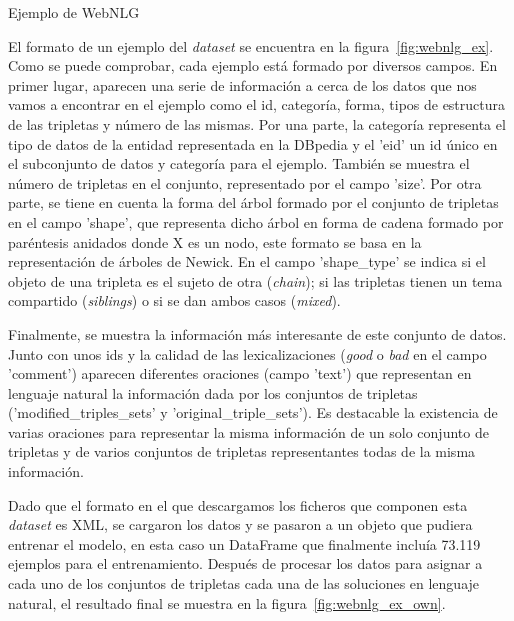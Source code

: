 %
{Ejemplo de WebNLG}

El formato de un ejemplo del \textit{dataset} se encuentra en la figura~\ref{fig:webnlg_ex}. Como se puede comprobar, cada ejemplo está formado por diversos campos. En primer lugar, aparecen una serie de información a cerca de los datos que nos vamos a encontrar en el ejemplo como el id, categoría, forma, tipos de estructura de las tripletas y número de las mismas. Por una parte, la categoría representa el tipo de datos de la entidad representada en la DBpedia y el 'eid' un id único en el subconjunto de datos y categoría para el ejemplo. También se muestra el número de tripletas en el conjunto, representado por el campo 'size'. Por otra parte, se tiene en cuenta la forma del árbol formado por el conjunto de tripletas en el campo 'shape', que representa dicho árbol en forma de cadena formado por paréntesis anidados donde X es un nodo, este formato se basa en la representación de árboles de Newick. En el campo 'shape\_type' se indica si el objeto de una tripleta es el sujeto de otra (\textit{chain}); si las tripletas tienen un tema compartido (\textit{siblings}) o si se dan ambos casos (\textit{mixed}). 



Finalmente, se muestra la información más interesante de este conjunto de datos. Junto con unos ids y la calidad  de las lexicalizaciones (\textit{good} o \textit{bad} en el campo 'comment') aparecen diferentes oraciones (campo 'text') que representan en lenguaje natural la información dada por los conjuntos de tripletas ('modified\_triples\_sets' y 'original\_triple\_sets'). Es destacable la existencia de varias oraciones para representar la misma información de un solo conjunto de tripletas y de varios conjuntos de tripletas representantes todas de la misma información.


Dado que el formato en el que descargamos los ficheros que componen esta \textit{dataset} es XML, se cargaron los datos y se pasaron a un objeto que pudiera entrenar el modelo, en esta caso un DataFrame que finalmente incluía 73.119 ejemplos para el entrenamiento. Después de procesar los datos para asignar a cada uno de los conjuntos de tripletas cada una de las soluciones en lenguaje natural, el resultado final se muestra en la figura~\ref{fig:webnlg_ex_own}.


